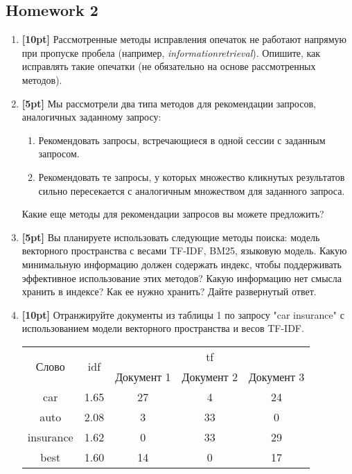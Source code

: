 \subsection*{Homework 2}

\begin{enumerate}
	\item \textbf{[10pt]} Рассмотренные методы исправления опечаток не работают напрямую при 
	пропуске пробела (например, \textit{informationretrieval}). Опишите, как исправлять такие 
	опечатки (не обязательно на основе рассмотренных методов).
	
	\item \textbf{[5pt]} Мы рассмотрели два типа методов для рекомендации запросов, аналогичных 
	заданному запросу:
	\begin{enumerate}
		\item Рекомендовать запросы, встречающиеся в одной сессии с заданным запросом.
		\item Рекомендовать те запросы, у которых множество кликнутых результатов сильно 	
		пересекается с аналогичным множеством для заданного запроса.
	\end{enumerate}

	Какие еще методы для рекомендации запросов вы можете предложить?
	
	\item \textbf{[5pt]} Вы планируете использовать следующие методы поиска: модель векторного 
	пространства с весами TF-IDF, BM25, языковую модель. Какую минимальную информацию должен 
	содержать индекс, чтобы поддерживать эффективное использование этих методов? Какую информацию 
	нет смысла хранить в индексе? Как ее нужно хранить? Дайте развернутый ответ.
	
	\item \textbf{[10pt]} Отранжируйте документы из таблицы 1 по запросу "car insurance" с 
	использованием модели векторного пространства и весов TF-IDF.
	
	\begin{tabular}{c | c | c c c}
		\multirow{2}{*}{Слово} & \multirow{2}{*}{idf} & \multicolumn{3}{c}{tf} \\ \cline{3-5}
		& & Документ 1 & Документ 2 & Документ 3 \\ \hline	
		car & 1.65 & 27 & 4 & 24 \\
		auto & 2.08 & 3 & 33 & 0 \\
		insurance & 1.62 & 0 & 33 & 29 \\
		best & 1.60 & 14 & 0 & 17 \\
	\end{tabular}
	

\end{enumerate}
